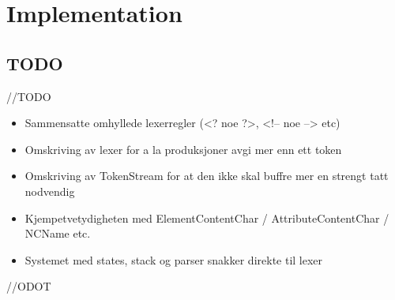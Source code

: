 \chapter{Implementation}



\section{TODO}
//TODO
\begin{itemize}
\item Sammensatte omhyllede lexerregler (<? noe ?>, <!-- noe --> etc)
\item Omskriving av lexer for a la produksjoner avgi mer enn ett token
\item Omskriving av TokenStream for at den ikke skal buffre mer en strengt tatt nodvendig
\item Kjempetvetydigheten med ElementContentChar / AttributeContentChar / NCName etc.
\item Systemet med states, stack og parser snakker direkte til lexer
\end{itemize}

//ODOT
